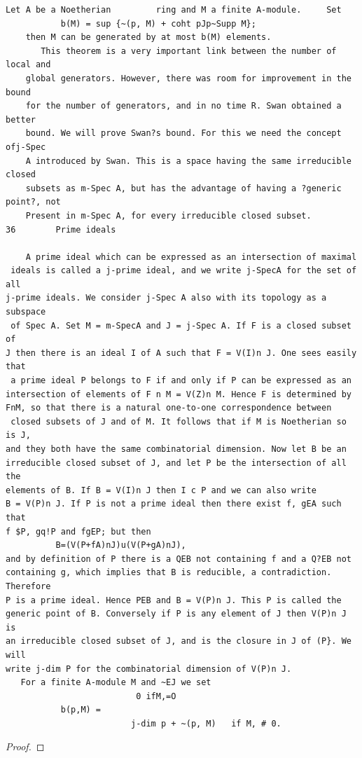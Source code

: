 \begin{theorem}\label{mcrt-auto-theorem-5-7}\uses{}
\begin{verbatim}
Let A be a Noetherian         ring and M a finite A-module.     Set
           b(M) = sup {~(p, M) + coht pJp~Supp M};
    then M can be generated by at most b(M) elements.
       This theorem is a very important link between the number of local and
    global generators. However, there was room for improvement in the bound
    for the number of generators, and in no time R. Swan obtained a better
    bound. We will prove Swan?s bound. For this we need the concept ofj-Spec
    A introduced by Swan. This is a space having the same irreducible closed
    subsets as m-Spec A, but has the advantage of having a ?generic point?, not
    Present in m-Spec A, for every irreducible closed subset.
36        Prime ideals

    A prime ideal which can be expressed as an intersection of maximal
 ideals is called a j-prime ideal, and we write j-SpecA for the set of all
j-prime ideals. We consider j-Spec A also with its topology as a subspace
 of Spec A. Set M = m-SpecA and J = j-Spec A. If F is a closed subset of
J then there is an ideal I of A such that F = V(I)n J. One sees easily that
 a prime ideal P belongs to F if and only if P can be expressed as an
intersection of elements of F n M = V(Z)n M. Hence F is determined by
FnM, so that there is a natural one-to-one correspondence between
 closed subsets of J and of M. It follows that if M is Noetherian so is J,
and they both have the same combinatorial dimension. Now let B be an
irreducible closed subset of J, and let P be the intersection of all the
elements of B. If B = V(I)n J then I c P and we can also write
B = V(P)n J. If P is not a prime ideal then there exist f, gEA such that
f $P, gq!P and fgEP; but then
          B=(V(P+fA)nJ)u(V(P+gA)nJ),
and by definition of P there is a QEB not containing f and a Q?EB not
containing g, which implies that B is reducible, a contradiction. Therefore
P is a prime ideal. Hence PEB and B = V(P)n J. This P is called the
generic point of B. Conversely if P is any element of J then V(P)n J is
an irreducible closed subset of J, and is the closure in J of (P}. We will
write j-dim P for the combinatorial dimension of V(P)n J.
   For a finite A-module M and ~EJ we set
                          0 ifM,=O
           b(p,M) =
                         j-dim p + ~(p, M)   if M, # 0.
\end{verbatim}
\end{theorem}
\begin{proof}
\notready
\end{proof}


